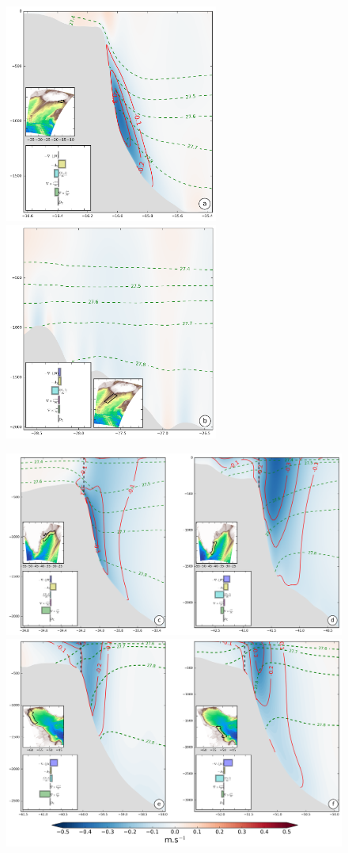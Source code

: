 \documentclass{ametsoc}
\begin{document}
\begin{figure}[H]
\centerline{\includegraphics[width=7cm]{./v_b/section_RR_1.png}
\includegraphics[width=7cm]{./v_b/section_RR_2.png}}
\centerline{\includegraphics[width=14cm]{./v_b/section_green.png}}
\centerline{\includegraphics[width=14cm]{./v_b/section_lab.png}}
\label{int_NL}
\end{figure} 
\end{document}
